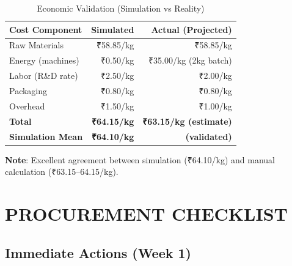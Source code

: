 \documentclass[12pt,a4paper]{article}
\begin{document}
\begin{table}[h]
\centering
\begin{tabular}{lrr}
\toprule
\textbf{Cost Component} & \textbf{Simulated} & \textbf{Actual (Projected)} \\
\midrule
Raw Materials & ₹58.85/kg & ₹58.85/kg \\
Energy (machines) & ₹0.50/kg & ₹35.00/kg (2kg batch) \\
Labor (R\&D rate) & ₹2.50/kg & ₹2.00/kg \\
Packaging & ₹0.80/kg & ₹0.80/kg \\
Overhead & ₹1.50/kg & ₹1.00/kg \\
\midrule
\textbf{Total} & \textbf{₹64.15/kg} & \textbf{₹63.15/kg (estimate)} \\
\textbf{Simulation Mean} & \textbf{₹64.10/kg} & \textbf{(validated)} \\
\bottomrule
\end{tabular}
\caption{Economic Validation (Simulation vs Reality)}
\end{table}

\textbf{Note}: Excellent agreement between simulation (₹64.10/kg) and manual calculation (₹63.15--64.15/kg).

\section{PROCUREMENT CHECKLIST}

\subsection{Immediate Actions (Week 1)}
\end{document}

